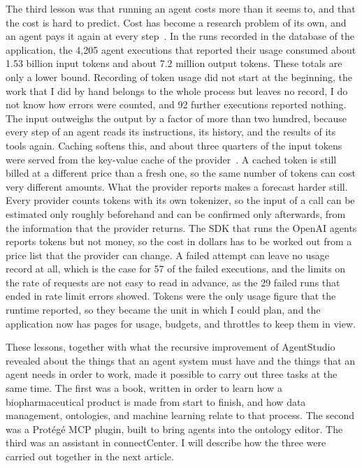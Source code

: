 \documentclass[11pt,a4paper]{article}
\begin{document}
The third lesson was that running an agent costs more than it seems to, and that the cost is hard
to predict.
Cost has become a research problem of its own, and an agent pays it again at every
step~\cite{chen2024frugalgpt,yang2024sweagent}.
In the runs recorded in the database of the application, the 4,205 agent executions that
reported their usage consumed about 1.53 billion input tokens and about 7.2 million output
tokens.
These totals are only a lower bound.
Recording of token usage did not start at the beginning, the work that I did by hand belongs to
the whole process but leaves no record, I do not know how errors were counted, and 92 further
executions reported nothing.
The input outweighs the output by a factor of more than two hundred, because every step of an
agent reads its instructions, its history, and the results of its tools again.
Caching softens this, and about three quarters of the input tokens were served from the
key-value cache of the provider~\cite{kwon2023pagedattention,zheng2024sglang}.
A cached token is still billed at a different price than a fresh one, so the same number of
tokens can cost very different amounts.
What the provider reports makes a forecast harder still.
Every provider counts tokens with its own tokenizer, so the input of a call can be estimated only
roughly beforehand and can be confirmed only afterwards, from the information that the provider
returns.
The SDK that runs the OpenAI agents reports tokens but not money, so the cost in dollars has to
be worked out from a price list that the provider can change.
A failed attempt can leave no usage record at all, which is the case for 57 of the failed
executions, and the limits on the rate of requests are not easy to read in advance, as the 29
failed runs that ended in rate limit errors showed.
Tokens were the only usage figure that the runtime reported, so they became the unit in which I
could plan, and the application now has pages for usage, budgets, and throttles to keep them in
view.

These lessons, together with what the recursive improvement of AgentStudio revealed about the
things that an agent system must have and the things that an agent needs in order to work, made it
possible to carry out three tasks at the same time.
The first was a book, written in order to learn how a biopharmaceutical product is made from
start to finish, and how data management, ontologies, and machine learning relate to that
process.
The second was a Prot\'eg\'e MCP plugin, built to bring agents into the ontology editor.
The third was an assistant in connectCenter.
I will describe how the three were carried out together in the next article.



\end{document}
